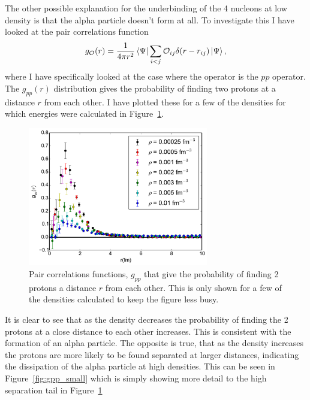 The other possible explanation for the underbinding of the 4 nucleons at low density is that the alpha particle doesn't form at all. To investigate this I have looked at the pair correlations function
\begin{equation}
   g_\mathcal{O}(r) = \frac{1}{4\pi r^2} \left< \Psi \right|\sum\limits_{i<j}\mathcal{O}_{ij}\delta(r-r_{ij})\left| \Psi \right>,
\end{equation}
where I have specifically looked at the case where the operator is the $pp$ operator. The $g_{pp}(r)$ distribution gives the probability of finding two protons at a distance $r$ from each other. I have plotted these for a few of the densities for which energies were calculated in Figure~\ref{fig:gpp}.
\begin{figure}[h!]
   \centering
   \includegraphics[width=0.7\textwidth]{figures/gpp.pdf}
   \caption{Pair correlations functions, $g_{pp}$ that give the probability of finding 2 protons a distance $r$ from each other. This is only shown for a few of the densities calculated to keep the figure less busy.}
   \label{fig:gpp}
\end{figure}
It is clear to see that as the density decreases the probability of finding the 2 protons at a close distance to each other increases. This is consistent with the formation of an alpha particle. The opposite is true, that as the density increases the protons are more likely to be found separated at larger distances, indicating the dissipation of the alpha particle at high densities. This can be seen in Figure~\ref{fig:gpp_small} which is simply showing more detail to the high separation tail in Figure~\ref{fig:gpp}
